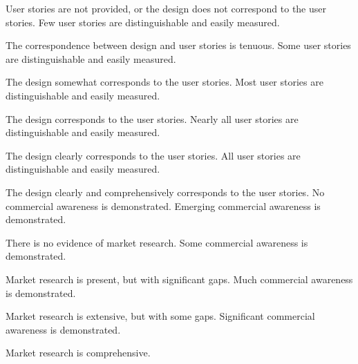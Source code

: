 \documentclass{../fal_assignment}
\begin{document}
\begin{markingrubric}
        \grade\fail User stories are not provided, or the design does not correspond to the user stories.
        \grade Few user stories are distinguishable and easily measured.
            \par The correspondence between design and user stories is tenuous.
        \grade Some user stories are distinguishable and easily measured.
            \par The design somewhat corresponds to the user stories.
        \grade Most user stories are distinguishable and easily measured.
            \par The design corresponds to the user stories.
        \grade Nearly all user stories are distinguishable and easily measured.
            \par The design clearly corresponds to the user stories.
        \grade All user stories are distinguishable and easily measured.
            \par The design clearly and comprehensively corresponds to the user stories.
        \grade\fail No commercial awareness is demonstrated.
        \grade Emerging commercial awareness is demonstrated.
            \par There is no evidence of market research.
        \grade Some commercial awareness is demonstrated.
            \par Market research is present, but with significant gaps.
        \grade Much commercial awareness is demonstrated.
            \par Market research is extensive, but with some gaps.
        \grade Significant commercial awareness is demonstrated.
            \par Market research is comprehensive.

\end{markingrubric}
\end{document}
